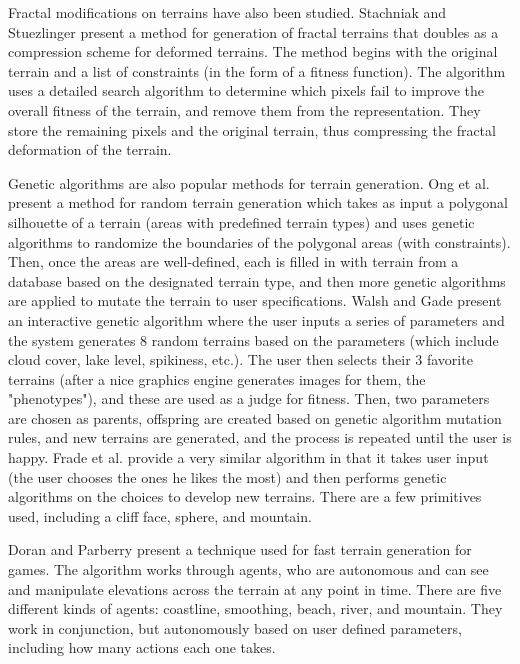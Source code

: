 Fractal modifications on terrains have also been studied. Stachniak and Stuezlinger \cite{Stachniak_Stuerzlinger_2005} present a method for generation of fractal terrains that doubles as a compression scheme for deformed terrains. The method begins with the original terrain and a list of constraints (in the form of a fitness function). The algorithm uses a detailed search algorithm to determine which pixels fail to improve the overall fitness of the terrain, and remove them from the representation. They store the remaining pixels and the original terrain, thus compressing the fractal deformation of the terrain.

Genetic algorithms are also popular methods for terrain generation. Ong et al. \cite{Ong:2005:TGU:1068009.1068241} present a method for random terrain generation which takes as input a polygonal silhouette of a terrain (areas with predefined terrain types) and uses genetic algorithms to randomize the boundaries of the polygonal areas (with constraints). Then, once the areas are well-defined, each is filled in with terrain from a database based on the designated terrain type, and then more genetic algorithms are applied to mutate the terrain to user specifications. 
% 
Walsh and Gade \cite{5585913} present an interactive genetic algorithm where the user inputs a series of parameters and the system generates 8 random terrains based on the parameters (which include cloud cover, lake level, spikiness, etc.). The user then selects their 3 favorite terrains (after a nice graphics engine generates images for them, the "phenotypes"), and these are used as a judge for fitness. Then, two parameters are chosen as parents, offspring are created based on genetic algorithm mutation rules, and new terrains are generated, and the process is repeated until the user is happy.
% 
Frade et al. \cite{FradeVC09} provide a very similar algorithm in that it takes user input (the user chooses the ones he likes the most) and then performs genetic algorithms on the choices to develop new terrains. There are a few primitives used, including a cliff face, sphere, and mountain.


Doran and Parberry \cite{Doran2010Terrain} present a technique used for fast terrain generation for games. The algorithm works through agents, who are autonomous and can see and manipulate elevations across the terrain at any point in time. There are five different kinds of agents: coastline, smoothing, beach, river, and mountain. They work in conjunction, but autonomously based on user defined parameters, including how many actions each one takes.

